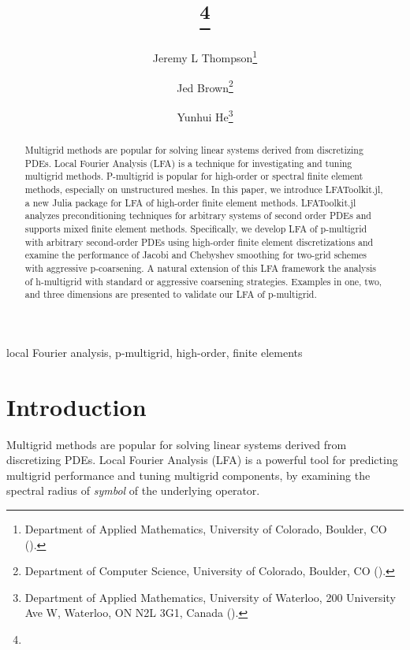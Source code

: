 \documentclass[review]{siamart190516}
\author{
Jeremy L Thompson\thanks{Department of Applied Mathematics, University of Colorado, Boulder, CO
  (\email{jeremy@jeremylt.org}).}
\and Jed Brown\thanks{Department of Computer Science, University of Colorado, Boulder, CO
  (\email{jed@jedbrown.org}).}
\and Yunhui He\thanks{Department of Applied Mathematics,
University of Waterloo, 200 University Ave W, Waterloo, ON N2L 3G1, Canada
  (\email{yunhui.he@uwaterloo.ca}).}
}
\title{{\TheTitle}\thanks{\TheFunding}}
\begin{document}
\maketitle

\vspace{1cm}

\begin{abstract}
Multigrid methods are popular for solving linear systems derived from discretizing PDEs.
Local Fourier Analysis (LFA) is a technique for investigating and tuning multigrid methods.
P-multigrid is popular for high-order or spectral finite element methods, especially on unstructured meshes.
In this paper, we introduce LFAToolkit.jl, a new Julia package for LFA of high-order finite element methods.
LFAToolkit.jl analyzes preconditioning techniques for arbitrary systems of second order PDEs and supports mixed finite element methods.
Specifically, we develop LFA of p-multigrid with arbitrary second-order PDEs using high-order finite element discretizations and examine the performance of Jacobi and Chebyshev smoothing for two-grid schemes with aggressive p-coarsening.
A natural extension of this LFA framework the analysis of h-multigrid with standard or aggressive coarsening strategies.
Examples in one, two, and three dimensions are presented to validate our LFA of p-multigrid.
\end{abstract}

\begin{keywords}
  local Fourier analysis, p-multigrid, high-order, finite elements
\end{keywords}

\section{Introduction}\label{sec:intro}

Multigrid methods \cite{brandt1982guide, briggs2000multigrid, stuben1982multigrid} are popular for solving linear systems derived from discretizing PDEs.
Local Fourier Analysis (LFA) \cite{brandt1977multi, wienands2004practical} is a powerful tool for predicting multigrid performance and tuning multigrid components, by examining the spectral radius of {\em{symbol}} of the underlying operator.
\end{document}
